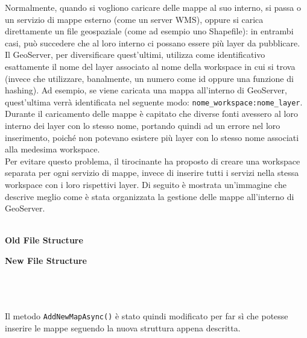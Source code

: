 Normalmente, quando si vogliono caricare delle mappe al suo interno, si passa o un servizio di mappe esterno (come un server WMS), oppure si carica direttamente un file geospaziale (come ad esempio uno Shapefile): in entrambi casi, può succedere che al loro interno ci possano essere più layer da pubblicare. 
\\Il GeoServer, per diversificare quest'ultimi, utilizza come identificativo esattamente il nome del layer associato al nome della workspace in cui si trova (invece che utilizzare, banalmente, un numero come id oppure una funzione di hashing). Ad esempio, se viene caricata una mappa all'interno di GeoServer, quest'ultima verrà identificata nel seguente modo: \verb|nome_workspace:nome_layer|.
\\Durante il caricamento delle mappe è capitato che diverse fonti avessero al loro interno dei layer con lo stesso nome, portando quindi ad un errore nel loro inserimento, poiché non potevano esistere più layer con lo stesso nome associati alla medesima workspace.
\\Per evitare questo problema, il tirocinante ha proposto di creare una workspace separata per ogni servizio di mappe, invece di inserire tutti i servizi nella stessa workspace con i loro rispettivi layer. Di seguito è mostrata un'immagine che descrive meglio come è stata organizzata la gestione delle mappe all'interno di GeoServer.
\\~\\
\begin{minipage}{0.5\textwidth}
\textbf{Old File Structure}
\end{minipage}%
\begin{minipage}{0.5\textwidth}
%
\textbf{New File Structure}
\end{minipage}
\\~\\\smallskip
\\Il metodo \verb|AddNewMapAsync()| è stato quindi modificato per far sì che potesse inserire le mappe seguendo la nuova struttura appena descritta. 

